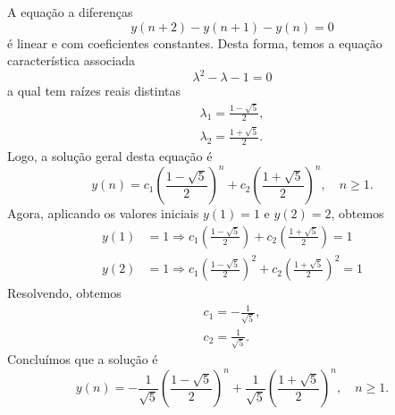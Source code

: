\begin{resol}
  A equação a diferenças
  \begin{equation}
    y(n+2)-y(n+1)-y(n)=0
  \end{equation}
  é linear e com coeficientes constantes. Desta forma, temos a equação característica associada
  \begin{equation}
    \lambda^2 - \lambda -1 = 0
  \end{equation}
  a qual tem raízes reais distintas
  \begin{align*}
    \lambda_1 = \frac{1-\sqrt{5}}{2},\\
    \lambda_2 = \frac{1+\sqrt{5}}{2}.
  \end{align*}
  Logo, a solução geral desta equação é
  \begin{equation}
    y(n) = c_1\left(\frac{1-\sqrt{5}}{2}\right)^n + c_2\left(\frac{1+\sqrt{5}}{2}\right)^n,\quad n\geq 1.
  \end{equation}
  Agora, aplicando os valores iniciais $y(1)=1$ e $y(2)=2$, obtemos
  \begin{align*}
    y(1)&=1\Rightarrow c_1\left(\frac{1-\sqrt{5}}{2}\right) + c_2\left(\frac{1+\sqrt{5}}{2}\right) = 1\\
    y(2)&=1\Rightarrow c_1\left(\frac{1-\sqrt{5}}{2}\right)^2 + c_2\left(\frac{1+\sqrt{5}}{2}\right)^2 = 1
  \end{align*}
  Resolvendo, obtemos
  \begin{gather}
    c_1 = -\frac{1}{\sqrt{5}},\\
    c_2 = \frac{1}{\sqrt{5}}.
  \end{gather}
  Concluímos que a solução é
  \begin{equation}
    y(n) = -\frac{1}{\sqrt{5}}\left(\frac{1-\sqrt{5}}{2}\right)^n + \frac{1}{\sqrt{5}}\left(\frac{1+\sqrt{5}}{2}\right)^n,\quad n\geq 1.
  \end{equation}
\end{resol}

